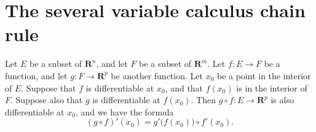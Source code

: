 \section{The several variable calculus chain rule}\label{sec 6.4}

\begin{theorem}\label{6.4.1}
    Let \(E\) be a subset of \(\mathbf{R}^n\), and let \(F\) be a subset of \(\mathbf{R}^m\).
    Let \(f : E \to F\) be a function, and let \(g : F \to \mathbf{R}^p\) be another function.
    Let \(x_0\) be a point in the interior of \(E\).
    Suppose that \(f\) is differentiable at \(x_0\), and that \(f(x_0)\) is in the interior of \(F\).
    Suppose also that \(g\) is differentiable at \(f(x_0)\).
    Then \(g \circ f : E \to \mathbf{R}^p\) is also differentiable at \(x_0\), and we have the formula
    \[
        (g \circ f)'(x_0) = g'\big(f(x_0)\big) \circ f'(x_0).
    \]
\end{theorem}

